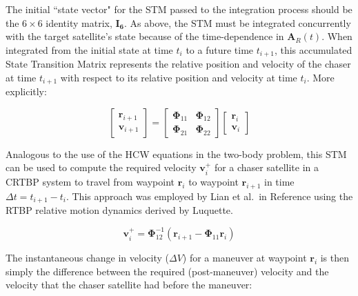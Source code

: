 \documentclass[a4paper]{article}
\begin{document}
The initial ``state vector" for the STM passed to the integration process should be the \(6\times6\) identity matrix, \(\mathbf{I_6}\).  As above, the STM must be integrated concurrently with the target satellite's state because of the time-dependence in \(\mathbf{A}_R(t)\).  When integrated from the initial state at time \(t_i\) to a future time \(t_{i+1}\), this accumulated State Transition Matrix represents the relative position and velocity of the chaser at time \(t_{i+1}\) with respect to its relative position and velocity at time \(t_i\).  More explicitly:


\begin{equation}
\begin{bmatrix}
		\mathbf{r}_{i+1} \\
		\mathbf{v}_{i+1}
		\end{bmatrix}
= 
\begin{bmatrix}
		\boldsymbol{\Phi}_{11} & \boldsymbol{\Phi}_{12} \\
		\boldsymbol{\Phi}_{21} & \boldsymbol{\Phi}_{22}
		\end{bmatrix}
\begin{bmatrix}
		\mathbf{r}_i \\
		\mathbf{v}_i
		\end{bmatrix}
\end{equation}

Analogous to the use of the HCW equations in the two-body problem, this STM can be used to compute the required velocity \(\mathbf{v}_i^+\) for a chaser satellite in a CRTBP system to travel from waypoint \(\mathbf{r}_i\) to waypoint \(\mathbf{r}_{i+1}\) in time \( \Delta t = t_{i+1} - t_i\).  This approach was employed by Lian et al.~in Reference \cite{lian2011} using the RTBP relative motion dynamics derived by Luquette. 



\begin{equation} \label{eq:RequiredVelocity}
\mathbf{v}_i^+ = \boldsymbol{\Phi}_{12}^{-1}(\mathbf{r}_{i+1} - \boldsymbol{\Phi}_{11}\mathbf{r}_i)
\end{equation}

The instantaneous change in velocity (\(\Delta V\)) for a maneuver at waypoint \(\mathbf{r}_i\) is then simply the difference between the required (post-maneuver) velocity and the velocity that the chaser satellite had before the maneuver:
\end{document}
